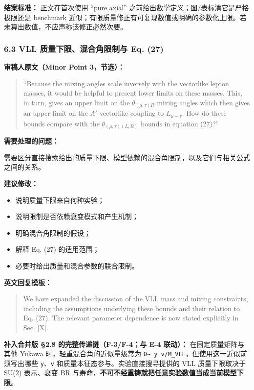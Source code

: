 \documentclass[
]{article}
\providecommand{\tightlist}{%
  \setlength{\itemsep}{0pt}\setlength{\parskip}{0pt}}
\begin{document}
\textbf{结案标准：} 正文在首次使用 ``pure axial''
之前给出数学定义；图/表标清它是严格极限还是 benchmark
近似；有限质量修正有可复现数值或明确的参数化上限。若未算出数值，不应声称该修正必然次要。

\subsubsection{6.3 VLL 质量下限、混合角限制与 Eq.
(27)}\label{vll-ux8d28ux91cfux4e0bux9650ux6df7ux5408ux89d2ux9650ux5236ux4e0e-eq.-27}

\textbf{审稿人原文（Minor Point 3，节选）：}

\begin{quote}
``Because the mixing angles scale inversely with the vectorlike lepton
masses, it would be helpful to present lower limits on these masses.
This, in turn, gives an upper limit on the \(\theta_{(\mu,\tau)R}\)
mixing angles which then gives an upper limit on the \(A'\) vectorlike
coupling to \(L_{\mu-\tau}\). How do these bounds compare with the
\(\theta_{(\mu,\tau)(L,R)}\) bounds in equation (27)?''
\end{quote}

\textbf{需要处理的问题：}

需要区分直接搜索给出的质量下限、模型依赖的混合角限制，以及它们与相关公式之间的关系。

\textbf{建议修改：}

\begin{itemize}
\tightlist
\item
  说明质量下限来自何种实验；
\item
  说明限制是否依赖衰变模式和产生机制；
\item
  明确混合角限制的假设；
\item
  解释 Eq. (27) 的适用范围；
\item
  必要时给出质量和混合参数的联合限制。
\end{itemize}

\textbf{英文回复模板：}

\begin{quote}
We have expanded the discussion of the VLL mass and mixing constraints,
including the assumptions underlying these bounds and their relation to
Eq. (27). The relevant parameter dependence is now stated explicitly in
Sec. {[}X{]}.
\end{quote}

\textbf{补入合并版 §2.8 的完整传递链（F-3/F-4；与 E-4 联动）：}
在固定质量矩阵与其他 Yukawa 时，轻重混合角的近似量级常为
\texttt{θ∼\ y\ v/M\_VLL}，但使用这一近似前须写出哪些
\texttt{y}、\texttt{v} 和质量本征态参与。实验直接搜寻提供的 VLL
质量下限取决于 SU(2) 表示、衰变 BR
与寿命，\textbf{不可不经重铸就把任意实验数值当成当前模型下限}。
\end{document}
